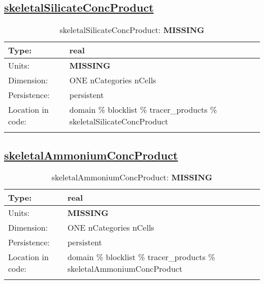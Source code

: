 \subsection[skeletalSilicateConcProduct]{\hyperref[sec:var_tab_tracer_products]{skeletalSilicateConcProduct}}
\label{subsec:var_sec_tracer_products_skeletalSilicateConcProduct}
\begin{center}
\begin{longtable}{| p{2.0in} | p{4.0in} |}
        \hline 
        Type: & real \\
        \hline 
        Units: & {\bf \color{red} MISSING} \\
        \hline 
        Dimension: & ONE nCategories nCells \\
        \hline 
        Persistence: & persistent \\
        \hline 
         Location in code: & domain \% blocklist \% tracer\_products \% skeletalSilicateConcProduct \\
         \hline 
    \caption{skeletalSilicateConcProduct: {\bf \color{red} MISSING}}
\end{longtable}
\end{center}
\subsection[skeletalAmmoniumConcProduct]{\hyperref[sec:var_tab_tracer_products]{skeletalAmmoniumConcProduct}}
\label{subsec:var_sec_tracer_products_skeletalAmmoniumConcProduct}
\begin{center}
\begin{longtable}{| p{2.0in} | p{4.0in} |}
        \hline 
        Type: & real \\
        \hline 
        Units: & {\bf \color{red} MISSING} \\
        \hline 
        Dimension: & ONE nCategories nCells \\
        \hline 
        Persistence: & persistent \\
        \hline 
         Location in code: & domain \% blocklist \% tracer\_products \% skeletalAmmoniumConcProduct \\
         \hline 
    \caption{skeletalAmmoniumConcProduct: {\bf \color{red} MISSING}}
\end{longtable}
\end{center}
